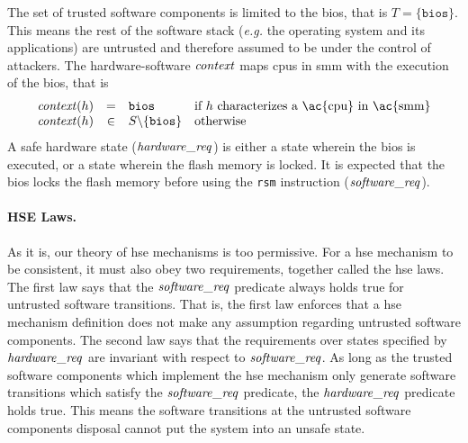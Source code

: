 \begin{example}
  The set of trusted software components is limited to the \ac{bios}, that is
  \( T = \{ \mathtt{bios} \} \).
  This means the rest of the software stack (\emph{e.g.} the operating system
  and its applications) are untrusted and therefore assumed to be under the
  control of attackers.
  The hardware-software \( \mathit{context} \) maps \acp{cpu} in \ac{smm} with the
  execution of the \ac{bios}, that is
  \[
    \begin{array}{rcll}
      \func{context}(h) & = & \mathtt{bios} & \text{if } h \text{ characterizes
                                              a \ac{cpu} in \ac{smm}} \\
      \func{context}(h) & \in & S \backslash \{ \mathtt{bios} \} & \text{otherwise}
    \end{array}
  \]
  A safe hardware state ($\mathit{hardware\_req}$) is either a state wherein the
  \ac{bios} is executed, or a state wherein the flash memory is locked.
  It is expected that the \ac{bios} locks the flash memory before using the
  \texttt{rsm} instruction ($\mathit{software\_req}$).
\end{example}

\paragraph{HSE Laws.}
%
As it is, our theory of \ac{hse} mechanisms is too permissive.
%
For a \ac{hse} mechanism to be consistent, it must also obey two requirements,
together called the \ac{hse} laws.
%
The first law says that the $\mathit{software\_req}$ predicate always holds true
for untrusted software transitions.
%
That is, the first law enforces that a \ac{hse} mechanism definition does not
make any assumption regarding untrusted software components.
%
The second law says that the requirements over states specified by
$\mathit{hardware\_req}$ are invariant with respect to $\mathit{software\_req}$.
%
As long as the trusted software components which implement the \ac{hse}
mechanism only generate software transitions which satisfy the
$\mathit{software\_req}$ predicate, the $\mathit{hardware\_req}$ predicate holds
true.
%
This means the software transitions at the untrusted software components
disposal cannot put the system into an unsafe state.

